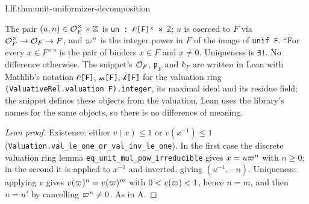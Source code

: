 \begin{theorem}
\end{theorem}
\begin{tfformal}{I.lf.thm:unit-uniformizer-decomposition}
\begin{tffidelity}
The pair $(u,n)\in\mathcal{O}_F^\times\times\mathbb{Z}$ is \texttt{un : 𝒪[F]ˣ × ℤ}; $u$ is coerced to $F$ via $\mathcal{O}_F^\times\to\mathcal{O}_F\to F$, and $\varpi^n$ is the integer power in $F$ of the image of \texttt{unif F}. ``For every $x\in F^\times$'' is the pair of binders $x\in F$ and $x\neq0$. Uniqueness is \texttt{∃!}. No difference otherwise. The snippet's $\mathcal{O}_F$, $\mathfrak p_F$ and $k_F$ are written in Lean with Mathlib's notation \texttt{𝒪[F]}, \texttt{𝓂[F]}, \texttt{𝓀[F]} for the valuation ring \texttt{(ValuativeRel.valuation F).integer}, its maximal ideal and its residue field; the snippet defines these objects from the valuation, Lean uses the library's names for the same objects, so there is no difference of meaning.
\end{tffidelity}
\end{tfformal}
\begin{proof}[Lean proof]
Existence: either $v(x)\le1$ or $v(x^{-1})\le1$ (\texttt{Valuation.val\_le\_one\_or\_val\_inv\_le\_one}). In the first case the discrete valuation ring lemma \texttt{eq\_unit\_mul\_pow\_irreducible} gives $x=u\varpi^n$ with $n\ge0$; in the second it is applied to $x^{-1}$ and inverted, giving $(u^{-1},-n)$. Uniqueness: applying $v$ gives $v(\varpi)^n=v(\varpi)^m$ with $0<v(\varpi)<1$, hence $n=m$, and then $u=u'$ by cancelling $\varpi^n\neq0$. As in A.
\end{proof}

